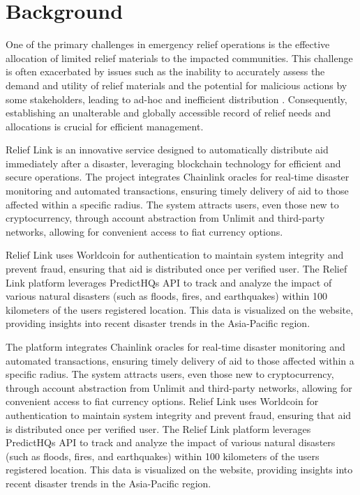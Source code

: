\documentclass[conference]{IEEEtran}
\begin{document}
\section{Background}
One of the primary challenges in emergency relief operations is the effective allocation of limited relief materials to the impacted communities. This challenge is often exacerbated by issues such as the inability to accurately assess the demand and utility of relief materials and the potential for malicious actions by some stakeholders, leading to ad-hoc and inefficient distribution \cite{b1}. Consequently, establishing an unalterable and globally accessible record of relief needs and allocations is crucial for efficient management.

Relief Link is an innovative service designed to automatically distribute aid immediately after a disaster, leveraging blockchain technology for efficient and secure operations. The project integrates Chainlink oracles for real-time disaster monitoring and automated transactions, ensuring timely delivery of aid to those affected within a specific radius. The system attracts users, even those new to cryptocurrency, through account abstraction from Unlimit and third-party networks, allowing for convenient access to fiat currency options.

Relief Link uses Worldcoin for authentication to maintain system integrity and prevent fraud, ensuring that aid is distributed once per verified user. The Relief Link platform leverages PredictHQs API to track and analyze the impact of various natural disasters (such as floods, fires, and earthquakes) within 100 kilometers of the users registered location. This data is visualized on the website, providing insights into recent disaster trends in the Asia-Pacific region.

The platform integrates Chainlink oracles for real-time disaster monitoring and automated transactions, ensuring timely delivery of aid to those affected within a specific radius. The system attracts users, even those new to cryptocurrency, through account abstraction from Unlimit and third-party networks, allowing for convenient access to fiat currency options. Relief Link uses Worldcoin for authentication to maintain system integrity and prevent fraud, ensuring that aid is distributed once per verified user. The Relief Link platform leverages PredictHQs API to track and analyze the impact of various natural disasters (such as floods, fires, and earthquakes) within 100 kilometers of the users registered location. This data is visualized on the website, providing insights into recent disaster trends in the Asia-Pacific region.
\end{document}
